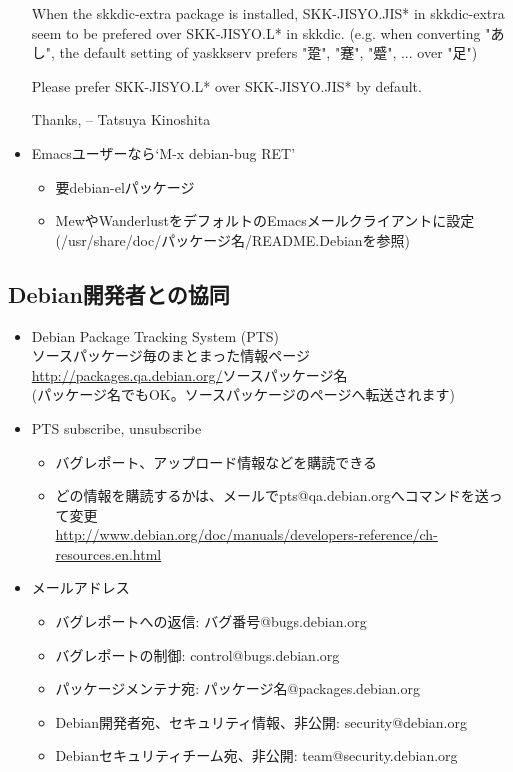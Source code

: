 \documentclass[mingoth,a4paper]{jsarticle}
\begin{document}
\begin{itemize}
\begin{commandline}
When the skkdic-extra package is installed, SKK-JISYO.JIS* in
skkdic-extra seem to be prefered over SKK-JISYO.L* in skkdic.
(e.g. when converting "あし", the default setting of yaskkserv
prefers "跫", "蹇", "蹙", ... over "足")

Please prefer SKK-JISYO.L* over SKK-JISYO.JIS* by default.

Thanks,
--
Tatsuya Kinoshita
\end{commandline}

\item Emacsユーザーなら`M-x debian-bug RET'
 \begin{itemize}
 \item 要debian-elパッケージ
 \item MewやWanderlustをデフォルトのEmacsメールクライアントに設定\\
 (/usr/share/doc/パッケージ名/README.Debianを参照)
 \end{itemize}
\end{itemize}

\subsection{Debian開発者との協同}
\begin{itemize}
\item Debian Package Tracking System (PTS)\\
ソースパッケージ毎のまとまった情報ページ\\
\url{http://packages.qa.debian.org/}ソースパッケージ名\\
(パッケージ名でもOK。ソースパッケージのページへ転送されます)

\item PTS subscribe, unsubscribe
 \begin{itemize}
 \item バグレポート、アップロード情報などを購読できる
 \item どの情報を購読するかは、メールでpts@qa.debian.orgへコマンドを送って変更\\
 \url{http://www.debian.org/doc/manuals/developers-reference/ch-resources.en.html}
 \end{itemize}

\item メールアドレス
 \begin{itemize}
 \item バグレポートへの返信: バグ番号@bugs.debian.org
 \item バグレポートの制御: control@bugs.debian.org
 \item パッケージメンテナ宛: パッケージ名@packages.debian.org
 \item Debian開発者宛、セキュリティ情報、非公開: security@debian.org
 \item Debianセキュリティチーム宛、非公開: team@security.debian.org
 \end{itemize}
\end{itemize}
\end{document}
